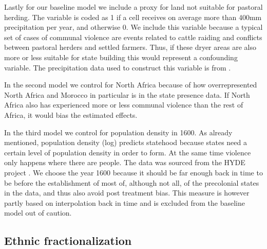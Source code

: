 Lastly for our baseline model we include a proxy for land not suitable for
pastoral herding. The variable is coded as 1 if a cell receives on average more
than 400mm precipitation per year, and otherwise 0. We include this variable
because a typical set of cases of communal violence are events related to cattle
raiding and conflicts between pastoral herders and settled farmers. Thus, if
these dryer areas are also more or less suitable for state building this would
represent a confounding variable. The precipitation data used to construct this
variable is from \citet{Schneider2015}.

In the second model we control for North Africa because of how overrepresented
North Africa and Morocco in particular is in the state presence data. If North
Africa also has experienced more or less communal violence than the rest of
Africa, it would bias the estimated effects.

In the third model we control for population density in 1600. As already
mentioned, population density (log) predicts statehood because states need a
certain level of population density in order to form. At the same time violence
only happens where there are people. The data was sourced from the HYDE project
\citep{Goldewijk2016}. We choose the year 1600 because it should be far enough
back in time to be before the establishment of most of, although not all, of the
precolonial states in the data, and thus also avoid post treatment bias. This
measure is however partly based on interpolation back in time and is
excluded from the baseline model out of caution. 

\subsection{Ethnic fractionalization} \label{Observable settlement patterns}

